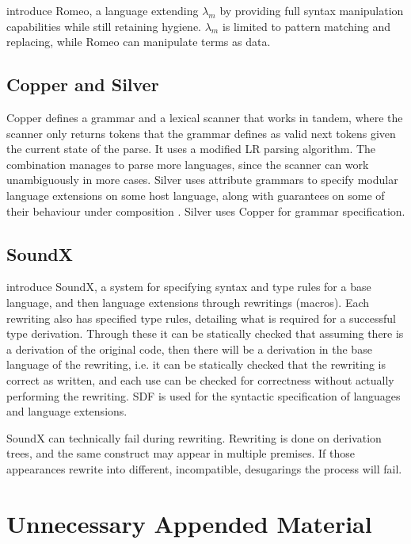 \documentclass{kththesis}
\begin{document}
\textcite{Stansifer2014} introduce Romeo, a language extending $\lambda_m$ by providing full syntax manipulation capabilities while still retaining hygiene. $\lambda_m$ is limited to pattern matching and replacing, while Romeo can manipulate terms as data.

\section{Copper and Silver}

Copper \cite{VanWyk2007} defines a grammar and a lexical scanner that works in tandem, where the scanner only returns tokens that the grammar defines as valid next tokens given the current state of the parse. It uses a modified LR parsing algorithm. The combination manages to parse more languages, since the scanner can work unambiguously in more cases. Silver \cite{VanWyk2010} uses attribute grammars to specify modular language extensions on some host language, along with guarantees on some of their behaviour under composition \cite{Kaminski2017}. Silver uses Copper for grammar specification.

\section{SoundX}

\textcite{Lorenzen2016} introduce SoundX, a system for specifying syntax and type rules for a base language, and then language extensions through rewritings (macros). Each rewriting also has specified type rules, detailing what is required for a successful type derivation. Through these it can be statically checked that assuming there is a derivation of the original code, then there will be a derivation in the base language of the rewriting, i.e. it can be statically checked that the rewriting is correct as written, and each use can be checked for correctness without actually performing the rewriting. SDF is used for the syntactic specification of languages and language extensions.

SoundX can technically fail during rewriting. Rewriting is done on derivation trees, and the same construct may appear in multiple premises. If those appearances rewrite into different, incompatible, desugarings the process will fail.

\printbibliography[heading=bibintoc] %

\appendix

\chapter{Unnecessary Appended Material}
\end{document}
